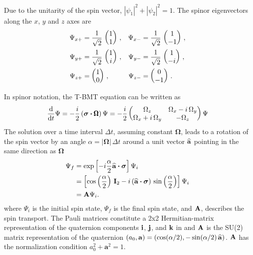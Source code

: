 Due to the unitarity of the spin vector,   
$|\psi_{1}|^{2} + |\psi_{2}|^{2} = 1$.
The spinor eigenvectors along the $x$, $y$ and $z$ axes are
\begin{align}
   \Psi_{x+} &= \frac{1}{\sqrt{2}} \, \begin{pmatrix} 1 \\ 1 \end{pmatrix} \, , 
  &\Psi_{x-} &= \frac{1}{\sqrt{2}} \, \begin{pmatrix} 1 \\ -1 \end{pmatrix} \, , \nonumber \\
   \Psi_{y+} &= \frac{1}{\sqrt{2}} \, \begin{pmatrix} 1 \\ i \end{pmatrix} \, , 
  &\Psi_{y-} &= \frac{1}{\sqrt{2}} \, \begin{pmatrix} 1 \\ -i \end{pmatrix} \, , \\
   \Psi_{z+} &=                       \begin{pmatrix} 1 \\ 0 \end{pmatrix} \, , 
  &\Psi_{z-} &=                       \begin{pmatrix} 0 \\ -1 \end{pmatrix} \, . \nonumber
\end{align}

In spinor notation, the T-BMT equation can be written as
  \begin{equation}   
    \frac{\mathrm{d}}{\mathrm{d} t} \Psi = - \frac{i}{2} \left( \boldsymbol{\sigma} \mathbin{\boldsymbol{\cdot}}   
    {\pmb\Omega} \right) \Psi = -\frac{i}{2} \begin{pmatrix}
    \Omega_z & \Omega_x - i \, \Omega_y \\
    \Omega_x + i \, \Omega_y & -\Omega_z \end{pmatrix}
    \Psi
  \end{equation}
The solution over a time interval $\Delta t$, assuming constant $\pmb\Omega$, leads to a rotation of
the spin vector by an angle $\alpha = |\pmb\Omega| \, \Delta t$ around a unit vector ${\widehat{\bf a}}$
pointing in the same direction as $\pmb\Omega$
  \begin{align}   
    \Psi_f &= \exp \left[ -i \frac{\alpha}{2} {\widehat{\bf a}} \mathbin{\boldsymbol{\cdot}} \boldsymbol{\sigma} \right] \Psi_i \nonumber \\
         &= \left[ \cos \left( \frac{\alpha}{2} \right) \, {\bf I}_{2} - 
            i \, ({\widehat{\bf a}} \mathbin{\boldsymbol{\cdot}} \boldsymbol{\sigma}) \, \sin \left( \frac{\alpha}{2} \right) \right] \Psi_i \\
         &= {\bf A} \Psi_i. \nonumber
  \end{align}   
where $\Psi_i$ is the initial spin state, $\Psi_f$ is the final spin state, and ${\bf A}$, describes
the spin transport. The Pauli matrices constitute a 2x2 Hermitian-matrix representation of the
quaternion components ${\bf i}$, ${\bf j}$, and ${\bf k}$ in  and ${\bf A}$ is the SU(2) matrix
representation of the quaternion $(a_0, {\bf a}) = (\cos(\alpha/2), -\sin(\alpha/2) \, {\widehat{\bf a}})$. ${\bf A}$ has the normalization condition $a_{0}^{2} + \boldsymbol{a}^{2} = 1$.

